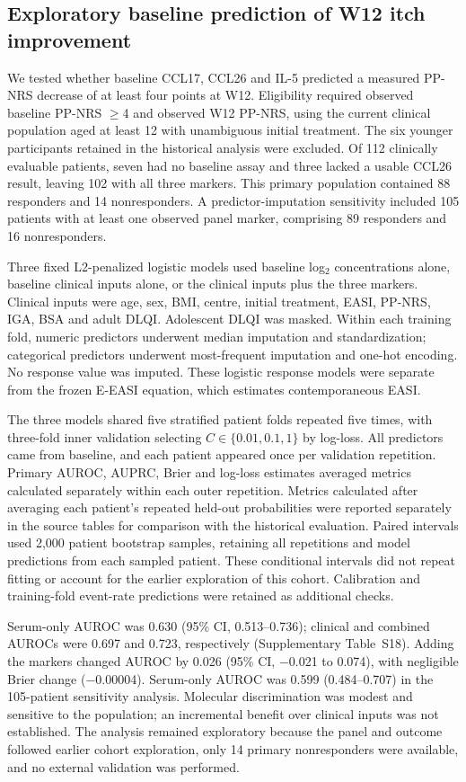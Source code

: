 \subsection{Exploratory baseline prediction of W12 itch improvement}
We tested whether baseline CCL17, CCL26 and IL-5 predicted a measured PP-NRS decrease of at least four points at W12. Eligibility required observed baseline PP-NRS $\geq$4 and observed W12 PP-NRS, using the current clinical population aged at least 12 with unambiguous initial treatment. The six younger participants retained in the historical analysis were excluded. Of 112 clinically evaluable patients, seven had no baseline assay and three lacked a usable CCL26 result, leaving 102 with all three markers. This primary population contained 88 responders and 14 nonresponders. A predictor-imputation sensitivity included 105 patients with at least one observed panel marker, comprising 89 responders and 16 nonresponders.

Three fixed L2-penalized logistic models used baseline log$_2$ concentrations alone, baseline clinical inputs alone, or the clinical inputs plus the three markers. Clinical inputs were age, sex, BMI, centre, initial treatment, EASI, PP-NRS, IGA, BSA and adult DLQI. Adolescent DLQI was masked. Within each training fold, numeric predictors underwent median imputation and standardization; categorical predictors underwent most-frequent imputation and one-hot encoding. No response value was imputed. These logistic response models were separate from the frozen E-EASI equation, which estimates contemporaneous EASI.

The three models shared five stratified patient folds repeated five times, with three-fold inner validation selecting $C\in\{0.01,0.1,1\}$ by log-loss. All predictors came from baseline, and each patient appeared once per validation repetition. Primary AUROC, AUPRC, Brier and log-loss estimates averaged metrics calculated separately within each outer repetition. Metrics calculated after averaging each patient's repeated held-out probabilities were reported separately in the source tables for comparison with the historical evaluation. Paired intervals used 2,000 patient bootstrap samples, retaining all repetitions and model predictions from each sampled patient. These conditional intervals did not repeat fitting or account for the earlier exploration of this cohort. Calibration and training-fold event-rate predictions were retained as additional checks.

Serum-only AUROC was 0.630 (95\% CI, 0.513--0.736); clinical and combined AUROCs were 0.697 and 0.723, respectively (Supplementary Table~S18). Adding the markers changed AUROC by 0.026 (95\% CI, $-$0.021 to 0.074), with negligible Brier change ($-$0.00004). Serum-only AUROC was 0.599 (0.484--0.707) in the 105-patient sensitivity analysis. Molecular discrimination was modest and sensitive to the population; an incremental benefit over clinical inputs was not established. The analysis remained exploratory because the panel and outcome followed earlier cohort exploration, only 14 primary nonresponders were available, and no external validation was performed.

